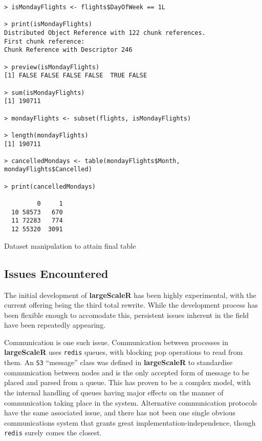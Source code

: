 \begin{listing}[H]
\begin{verbatim}
> isMondayFlights <- flights$DayOfWeek == 1L

> print(isMondayFlights)
Distributed Object Reference with 122 chunk references.
First chunk reference:
Chunk Reference with Descriptor 246

> preview(isMondayFlights)
[1] FALSE FALSE FALSE FALSE  TRUE FALSE

> sum(isMondayFlights)
[1] 190711

> mondayFlights <- subset(flights, isMondayFlights)

> length(mondayFlights)
[1] 190711

> cancelledMondays <- table(mondayFlights$Month, mondayFlights$Cancelled)

> print(cancelledMondays)

         0     1
  10 58573   670
  11 72283   774
  12 55320  3091
\end{verbatim}
\caption{Dataset manipulation to attain final table}\label{src:manipulation}
\end{listing}

\subsection{Issues Encountered}\label{sec:sys-imp}

The initial development of \textbf{largeScaleR} has been highly experimental, with the current offering being the third total rewrite.
While the development process has been flexible enough to accomodate this, persistent issues inherent in the field have been repeatedly appearing.

Communication is one such issue.
Communication between processes in \textbf{largeScaleR} uses \texttt{redis} queues, with blocking pop operations to read from them.
An \texttt{S3} ``message'' class was defined in \textbf{largeScaleR} to standardise communication between nodes and is the only accepted form of message to be placed and parsed from a queue.
This has proven to be a complex model, with the internal handling of queues having major effects on the manner of communication taking place in the system.
Alternative communication protocols have the same associated issue, and there has not been one single obvious communications system that grants great implementation-independence, though \texttt{redis} surely comes the closest\cite{sanfilippo2009redis}.

